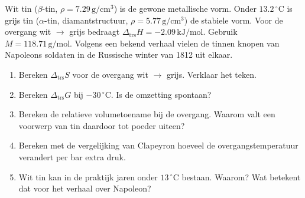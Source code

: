 \begin{oefening}
Wit tin (\ensuremath{\beta{}}-tin, \(\rho = 7.29\,\mathrm{g/cm^3}\)) is de gewone metallische vorm. Onder \(13.2\,^\circ\mathrm{C}\) is grijs tin (\ensuremath{\alpha{}}-tin, diamantstructuur, \(\rho = 5.77\,\mathrm{g/cm^3}\)) de stabiele vorm. Voor de overgang wit \ensuremath{\rightarrow{}} grijs bedraagt \(\Delta_{\text{trs}}H = -2.09\,\mathrm{kJ/mol}\). Gebruik \(M = 118.71\,\mathrm{g/mol}\). Volgens een bekend verhaal vielen de tinnen knopen van Napoleons soldaten in de Russische winter van 1812 uit elkaar.

\begin{enumerate}
\item[(a)]
  Bereken \(\Delta_{\text{trs}}S\) voor de overgang wit \ensuremath{\rightarrow{}} grijs. Verklaar het teken.
\item[(b)]
  Bereken \(\Delta_{\text{trs}}G\) bij \(-30\,^\circ\mathrm{C}\). Is de omzetting spontaan?
\item[(c)]
  Bereken de relatieve volumetoename bij de overgang. Waarom valt een voorwerp van tin daardoor tot poeder uiteen?
\item[(d)]
  Bereken met de vergelijking van Clapeyron hoeveel de overgangstemperatuur verandert per bar extra druk.
\item[(e)]
  Wit tin kan in de praktijk jaren onder \(13\,^\circ\mathrm{C}\) bestaan. Waarom? Wat betekent dat voor het verhaal over Napoleon?
\end{enumerate}
\end{oefening}
